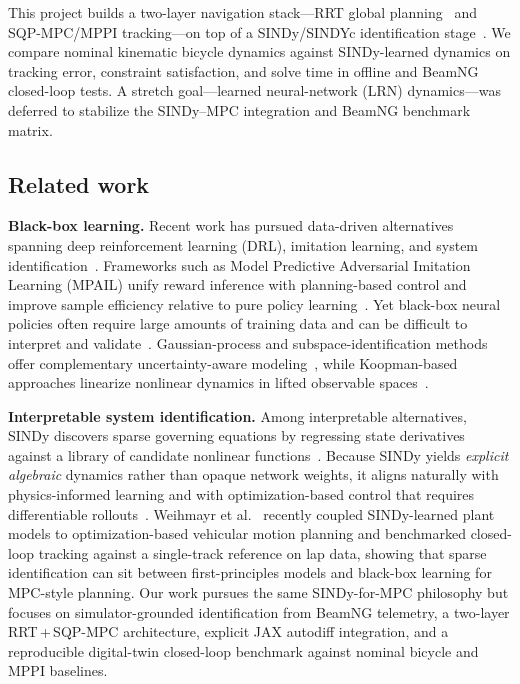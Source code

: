 \documentclass[letterpaper, 10 pt, conference]{ieeeconf}  %
\begin{document}
This project builds a two-layer navigation stack---RRT global planning~\cite{LaValle1998} and SQP-MPC/MPPI tracking---on top of a SINDy/SINDYc identification stage~\cite{Brunton2016SINDy,Brunton2016SINDYc}. We compare nominal kinematic bicycle dynamics against SINDy-learned dynamics on tracking error, constraint satisfaction, and solve time in offline and BeamNG~\cite{beamng_tech} closed-loop tests.
A stretch goal---learned neural-network (LRN) dynamics---was deferred to stabilize the SINDy--MPC integration and BeamNG benchmark matrix.

\subsection{Related work}

\textbf{Black-box learning.}
Recent work has pursued data-driven alternatives spanning deep reinforcement learning (DRL), imitation learning, and system identification~\cite{Hewing2020,Zhu2025,Sacks2022}.
Frameworks such as Model Predictive Adversarial Imitation Learning (MPAIL) unify reward inference with planning-based control and improve sample efficiency relative to pure policy learning~\cite{Han2025MPAIL}.
Yet black-box neural policies often require large amounts of training data and can be difficult to interpret and validate~\cite{Zolman2025}.
Gaussian-process and subspace-identification methods offer complementary uncertainty-aware modeling~\cite{Sathe2024,LinearSysId}, while Koopman-based approaches linearize nonlinear dynamics in lifted observable spaces~\cite{Bruder2019,Manzoor2023}.

\textbf{Interpretable system identification.}
Among interpretable alternatives, SINDy discovers sparse governing equations by regressing state derivatives against a library of candidate nonlinear functions~\cite{Brunton2016SINDy,Brunton2016SINDYc,Corbetta2020}.
Because SINDy yields \emph{explicit algebraic} dynamics rather than opaque network weights, it aligns naturally with physics-informed learning and with optimization-based control that requires differentiable rollouts~\cite{Corbetta2020}.
Weihmayr et al.~\cite{Weihmayr2025SINDyMPC} recently coupled SINDy-learned plant models to optimization-based vehicular motion planning and benchmarked closed-loop tracking against a single-track reference on lap data, showing that sparse identification can sit between first-principles models and black-box learning for MPC-style planning.
Our work pursues the same SINDy-for-MPC philosophy but focuses on simulator-grounded identification from BeamNG telemetry, a two-layer RRT\,+\,SQP-MPC architecture, explicit JAX autodiff integration, and a reproducible digital-twin closed-loop benchmark against nominal bicycle and MPPI baselines.
\end{document}
